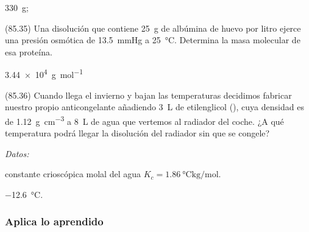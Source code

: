 \documentclass[10pt,a5paper,twoside]{article}
\newenvironment{gexdatos}{
      \vspace{4pt}
      \noindent\small\textit{Datos:}
    }{\vspace{5pt}}
\begin{document}
  \begin{solution}
    \begin{enumerate*}
      \item \SI{330}{\gram};
      \item {}
    \end{enumerate*}
  \end{solution}




  \begin{exercise}[
      tags    = {},
      topics  = {química,química básica},
      source  = {FQ 1B MGH 2016, p85, e35},
    ]
    (85.35) Una disolución que contiene \SI{25}{\gram} de albúmina de
    huevo por litro ejerce una presión osmótica de \SI{13.5}{\mmHg} a
    \SI{25}{\celsius}. Determina la masa molecular de esa proteína.
  \end{exercise}

  \begin{solution}
    \SI{3.44e4}{\gram\per\mole}
  \end{solution}



  \begin{exercise}[
      tags    = {},
      topics  = {química,química básica},
      source  = {FQ 1B MGH 2016, p85, e36},
    ]
    (85.36) Cuando llega el invierno y bajan las temperaturas decidimos fabricar nuestro propio anticongelante añadiendo \SI{3}{\liter} de etilenglicol (), cuya densidad es de \SI{1.12}{\gram\per\cubic\centi\meter} a \SI{8}{\liter} de agua que vertemos al radiador del coche. ¿A qué temperatura podrá llegar la disolución del radiador sin que se congele?

    \begin{gexdatos}
      constante crioscópica molal del agua \( K_c = \SI{1.86}{\celsius\kilo\gram\per\mole} \).
    \end{gexdatos}
  \end{exercise}

  \begin{solution}
    \SI{-12.6}{\celsius}.
  \end{solution}





  \subsubsection*{Aplica lo aprendido}
\end{document}
